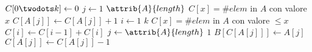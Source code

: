 \begin{codebox}
\li $C[0\twodots k] \leftarrow 0$
\li \For $j \gets 1$ \To $\attrib{A}{length}$
\zi     \Then
        \Comment $C[x] = \# elem$ in $A$ con valore $x$
\li         $C[A[j]] \gets C[A[j]] + 1$ 
        \End
\li \For $i \gets 1$ \To $k$
\zi     \Then
        \Comment $C[x] = \# elem$ in $A$ con valore $\leq x$
\li            $C[i] \gets C[i-1] + C[i]$ 
        \End
\li \For $j \gets \attrib{A}{length}$ \To $1$
\li     \Then
            $B[C[A[j]]] \gets A[j]$
\li         $C[A[j]] \gets C[A[j]] - 1$
        \End
\end{codebox}